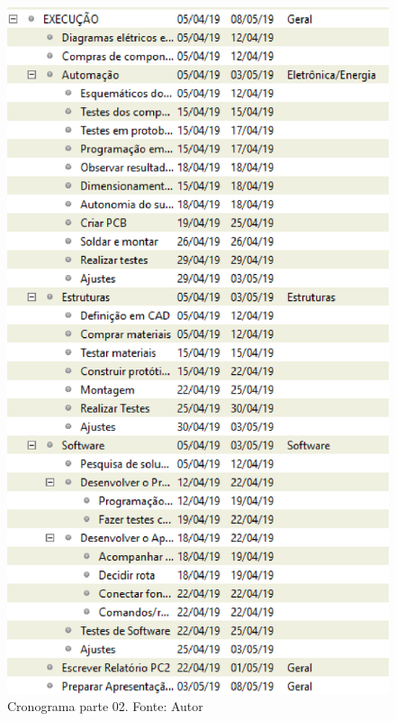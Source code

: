 \begin{apendicesenv}
\begin{figure}[ht]
    \centering
    \includegraphics[keepaspectratio=true,scale=1]{figuras/C2.eps}
    \caption[Cronograma parte 02.]{Cronograma parte 02. Fonte: Autor}
    \label{fig:cronograma2}
\end{figure}


\end{apendicesenv}
